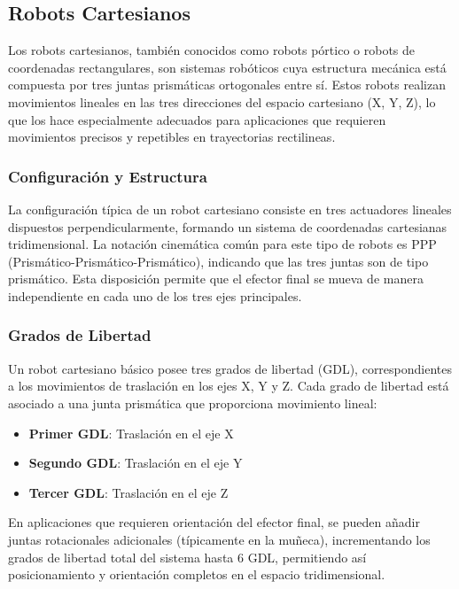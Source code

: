 \subsection{Robots Cartesianos}
Los robots cartesianos, también conocidos como robots pórtico o robots de coordenadas rectangulares, son sistemas robóticos cuya estructura mecánica está compuesta por tres juntas prismáticas ortogonales entre sí. Estos robots realizan movimientos lineales en las tres direcciones del espacio cartesiano (X, Y, Z), lo que los hace especialmente adecuados para aplicaciones que requieren movimientos precisos y repetibles en trayectorias rectilineas.

\subsubsection{Configuración y Estructura}

La configuración típica de un robot cartesiano consiste en tres actuadores lineales dispuestos perpendicularmente, formando un sistema de coordenadas cartesianas tridimensional. La notación cinemática común para este tipo de robots es PPP (Prismático-Prismático-Prismático), indicando que las tres juntas son de tipo prismático. Esta disposición permite que el efector final se mueva de manera independiente en cada uno de los tres ejes principales.

\subsubsection{Grados de Libertad}

Un robot cartesiano básico posee tres grados de libertad (GDL), correspondientes a los movimientos de traslación en los ejes X, Y y Z. Cada grado de libertad está asociado a una junta prismática que proporciona movimiento lineal:

\begin{itemize}
    \item \textbf{Primer GDL}: Traslación en el eje X
    \item \textbf{Segundo GDL}: Traslación en el eje Y
    \item \textbf{Tercer GDL}: Traslación en el eje Z
\end{itemize}

En aplicaciones que requieren orientación del efector final, se pueden añadir juntas rotacionales adicionales (típicamente en la muñeca), incrementando los grados de libertad total del sistema hasta 6 GDL, permitiendo así posicionamiento y orientación completos en el espacio tridimensional.

